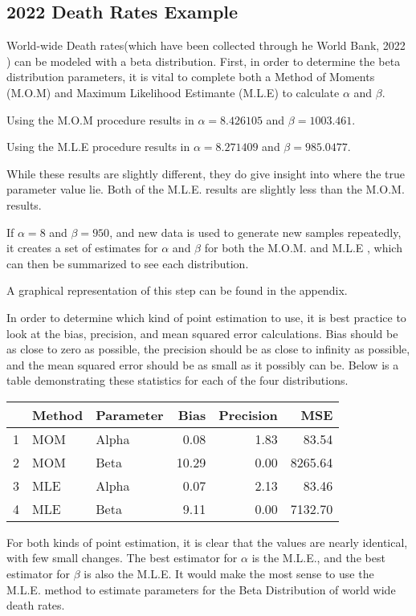 \documentclass{article}\usepackage[]{graphicx}\usepackage[]{xcolor}
\begin{document}
\begin{multicols}{2}
\section{2022 Death Rates Example}
World-wide Death rates(which have been collected through he World Bank, 2022 ) can be modeled with a beta distribution. First, in order to determine the beta distribution parameters, it is vital to complete both a Method of Moments (M.O.M) and Maximum Likelihood Estimante (M.L.E) to calculate $\alpha$ and $\beta$. 

Using the M.O.M procedure results in $\alpha = 8.426105$ and $\beta = 1003.461$.

Using the M.L.E procedure results in $\alpha = 8.271409$ and $\beta = 985.0477$.

While these results are slightly different, they do give insight into where the true parameter value lie. Both of the M.L.E. results are slightly less than the M.O.M. results.

If $\alpha = 8$ and $\beta = 950$, and new data is used to generate new samples repeatedly, it creates a set of estimates for $\alpha$ and $\beta$ for both the M.O.M. and M.L.E , which can then be summarized to see each distribution.

A graphical representation of this step can be found in the appendix. 

In order to determine which kind of point estimation to use, it is best practice to look at the bias, precision, and mean squared error calculations. Bias should be as close to zero as possible, the precision should be as close to infinity as possible, and the mean squared error should be as small as it possibly can be. Below is a table demonstrating these statistics for each of the four distributions.

\begin{table}[H]
\centering
\begin{tabular}{rllrrr}
  \hline
 & Method & Parameter & Bias & Precision & MSE \\ 
  \hline
1 & MOM & Alpha & 0.08 & 1.83 & 83.54 \\ 
  2 & MOM & Beta & 10.29 & 0.00 & 8265.64 \\ 
  3 & MLE & Alpha & 0.07 & 2.13 & 83.46 \\ 
  4 & MLE & Beta & 9.11 & 0.00 & 7132.70 \\ 
   \hline
\end{tabular}
\end{table}

For both kinds of point estimation, it is clear that the values are nearly identical, with few small changes. The best estimator for $\alpha$ is the M.L.E., and the best estimator for $\beta$ is also the M.L.E. It would make the most sense to use the M.L.E. method to estimate parameters for the Beta Distribution of world wide death rates.




\end{multicols}
\end{document}
